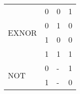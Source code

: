 \documentclass[a4paper]{article}
\begin{document}
\begin{center}
\begin{table}[h]
\begin{tabular}{|l|l|l|l|}
                       
  \hline
  \hline                       
\multirow{4}{*}{EXNOR}    
                       & 0 & 0 & 1 \\ \cline{2-4} 
                       & 0 & 1 & 0 \\ \cline{2-4} 
                       & 1 & 0 & 0 \\ \cline{2-4} 
                       & 1 & 1 & 1 \\ \cline{1-4}                          
                                                     
                                              
  \hline 
  \hline                                                     
\multirow{2}{*}{NOT}    
                       & 0 & - & 1 \\ \cline{2-4} 
                       & 1 & - & 0 \\ \cline{1-4} 
                                                  
                       
                                                  
                       
                       
                                               
                       
                       
                       
                       
                       
\end{tabular}
\end{table}
\end{center}
\end{document}
